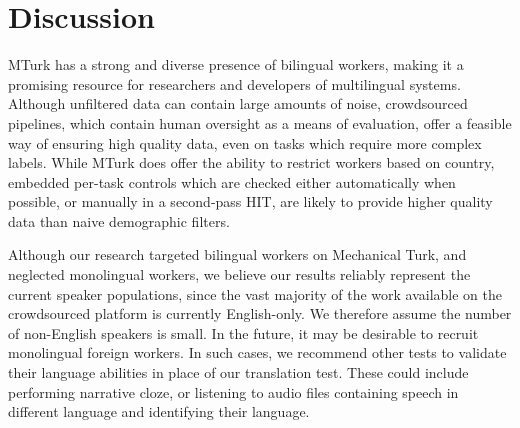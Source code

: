 \documentclass[11pt]{article}
\begin{document}
\section{Discussion}
MTurk has a strong and diverse presence of bilingual workers, making it a promising resource for researchers and developers of multilingual systems. Although unfiltered data can contain large amounts of noise, crowdsourced pipelines, which contain human oversight as a means of evaluation, offer a feasible way of ensuring high quality data, even on tasks which require more complex labels. While MTurk does offer the ability to restrict workers based on country, embedded per-task controls which are checked either automatically when possible, or manually in a second-pass HIT, are likely to provide higher quality data than naive demographic filters. 

Although our research targeted bilingual workers on Mechanical Turk, and neglected monolingual workers, we believe our results reliably represent the current speaker populations, since the vast majority of the work available on the crowdsourced platform is currently English-only.  We therefore assume the number of non-English speakers is small.  In the future, it may be desirable to recruit monolingual foreign workers.  In such cases, we recommend other tests to validate their language abilities in place of our translation test.  These could include performing narrative cloze, or listening to audio files containing speech in different language and identifying their language. 




\end{document}
